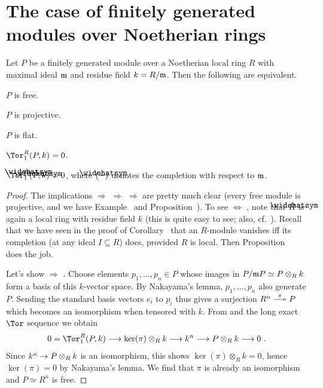 \documentclass[a4paper,parskip=half,numbers=enddot, DIV=12]{scrreprt}
\begin{document}
\section{The case of finitely generated modules over Noetherian rings}
\begin{prop}
	Let $P$ be a finitely generated module over a Noetherian local ring $R$ with maximal ideal $\mathfrak{m}$ and residue field $k=R/\mathfrak{m}$. Then the following are equivalent.
	\begin{alphanumerate}
		\item $P$ is free.
		\item $P$ is projective.
		\item $P$ is flat.
		\item $\Tor_1^R(P,k)=0$.
		\item $\Tor_1^{\roof{R}}(\roof{P},k)=0$, where $\roof{(-)}$ denotes the completion with respect to $\mathfrak{m}$.
	\end{alphanumerate}
\end{prop}
\begin{proof}
	The implications  $\Rightarrow$  $\Rightarrow$  $\Rightarrow$  are pretty much clear (every free module is projective, and we have Example~ and Proposition~). To see  $\Leftrightarrow$ , note that $\roof{R}$ is again a local ring with residue field $k$ (this is quite easy to see; also, cf.\ \cite[p.~192]{eisenbudCommAlg}). Recall that we have seen in the proof of Corollary~ that an $R$-module vanishes iff its completion (at any ideal $I\subseteq R$) does, provided $R$ is local. Then Proposition~ does the job.
	
	Let's show  $\Rightarrow$ . Choose elements $p_1,\ldots,p_n\in P$ whose images in $P/\mathfrak{m} P\simeq P\otimes_Rk$ form a basis of this $k$-vector space. By Nakayama's lemma, $p_1,\ldots,p_n$ also generate $P$. Sending the standard basis vectors $e_i$ to $p_i$ thus gives a surjection $R^n\epimorphism[\pi]P$ which becomes an isomorphism when tensored with $k$. From  and the long exact $\Tor$ sequence we obtain
	\begin{align*}
		0=\Tor_1^R(P,k)\morphism \ker(\pi)\otimes_Rk\morphism k^n\morphism P\otimes_Rk\morphism 0\;.
	\end{align*} 
	Since $k^n\morphism P\otimes_Rk$ is an isomorphism, this shows $\ker(\pi)\otimes_Rk=0$, hence $\ker(\pi)=0$ by Nakayama's lemma. We find that $\pi$ is already an isomorphism and $P\simeq R^n$ is free.
\end{proof}
\end{document}
